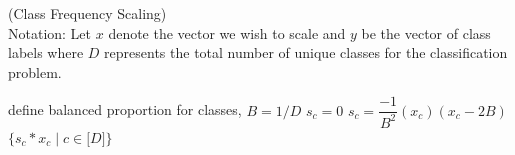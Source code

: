 \documentclass{article} %
\begin{document}
\begin{algorithm}[H]
\caption{ (Class Frequency Scaling) \\ 
Notation: Let $x$ denote the vector we wish to scale and $y$ be the vector of class labels where $D$ represents the total number of unique classes for the classification problem. 
}
\label{alg:scaling}
\begin{algorithmic}[1]
    \State define balanced proportion for classes, $B = 1/D$
                \State $s_c = 0$
            \Else
                \State $s_c = \dfrac{-1}{B^2}(x_c)(x_c - 2B)$
            \EndIf
        \EndFor
    \State \Return $\{s_c * x_c \mid c \in \mathopen[ D \mathclose] \}$
    \EndProcedure
\end{algorithmic}
\end{algorithm}
\end{document}
